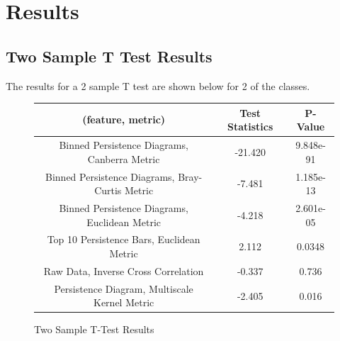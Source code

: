 \documentclass[12pt]{article}
\begin{document}
\section{Results}
\subsection{Two Sample T Test Results}
\-\hspace{1cm} The results for a 2 sample T test are shown below for 2 of the
classes.
\begin{figure}[!ht]
\begin{center}
\begin{tabular}{||c|c|c||}
\hline
(feature, metric) & Test Statistics & P-Value \\ 
\hline 
Binned Persistence Diagrams, Canberra Metric & -21.420 & 9.848e-91 \\ 
\hline
Binned Persistence Diagrams, Bray-Curtis Metric & -7.481 & 1.185e-13 \\
\hline 
Binned Persistence Diagrams, Euclidean Metric & -4.218 & 2.601e-05 \\ 
\hline
Top 10 Persistence Bars, Euclidean Metric & 2.112 & 0.0348 \\
\hline
Raw Data, Inverse Cross Correlation & -0.337 & 0.736 \\
\hline
Persistence Diagram, Multiscale Kernel Metric & -2.405 & 0.016 \\
\hline
\end{tabular}
\end{center}
\caption{Two Sample T-Test Results}
\end{figure}
\newpage
\end{document}
